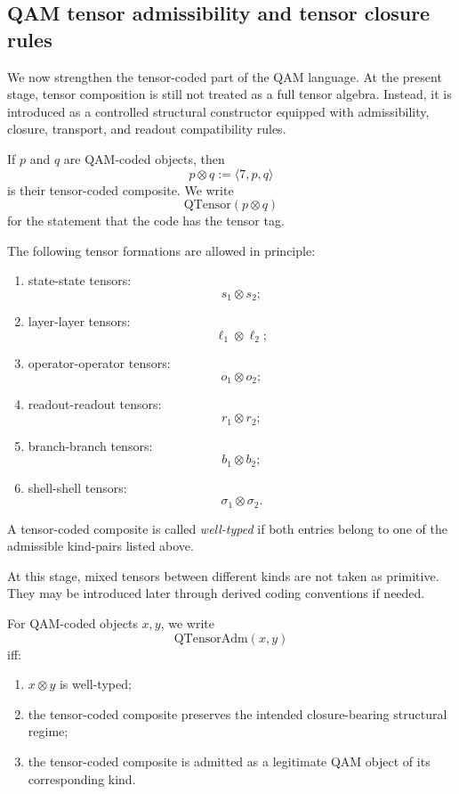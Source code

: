 \subsection*{QAM tensor admissibility and tensor closure rules}

We now strengthen the tensor-coded part of the QAM language. At the present stage, tensor composition is still not treated as a full tensor algebra. Instead, it is introduced as a controlled structural constructor equipped with admissibility, closure, transport, and readout compatibility rules.

\begin{definition}
If $p$ and $q$ are QAM-coded objects, then
\[
p\otimes q := \langle 7,p,q\rangle
\]
is their tensor-coded composite. We write
\[
\mathrm{QTensor}(p\otimes q)
\]
for the statement that the code has the tensor tag.
\end{definition}

\begin{definition}
The following tensor formations are allowed in principle:
\begin{enumerate}
\item state-state tensors:
\[
s_1\otimes s_2;
\]
\item layer-layer tensors:
\[
\ell_1\otimes \ell_2;
\]
\item operator-operator tensors:
\[
o_1\otimes o_2;
\]
\item readout-readout tensors:
\[
r_1\otimes r_2;
\]
\item branch-branch tensors:
\[
b_1\otimes b_2;
\]
\item shell-shell tensors:
\[
\sigma_1\otimes \sigma_2.
\]
\end{enumerate}
A tensor-coded composite is called \emph{well-typed} if both entries belong to one of the admissible kind-pairs listed above.
\end{definition}

\begin{remark}
At this stage, mixed tensors between different kinds are not taken as primitive. They may be introduced later through derived coding conventions if needed.
\end{remark}

\begin{definition}
For QAM-coded objects $x,y$, we write
\[
\mathrm{QTensorAdm}(x,y)
\]
iff:
\begin{enumerate}
\item $x\otimes y$ is well-typed;
\item the tensor-coded composite preserves the intended closure-bearing structural regime;
\item the tensor-coded composite is admitted as a legitimate QAM object of its corresponding kind.
\end{enumerate}
\end{definition}

